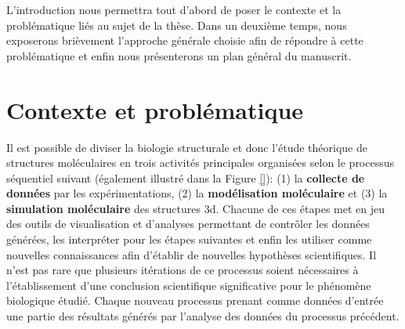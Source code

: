 


L'introduction nous permettra tout d'abord de poser le contexte et la problématique liés au sujet de la thèse. Dans un deuxième temps, nous exposerons brièvement l'approche générale choisie afin de répondre à cette problématique et enfin nous présenterons un plan général du manuscrit.

\section*{Contexte et problématique}

Il est possible de diviser la biologie structurale et donc l'étude théorique de structures moléculaires en trois activités principales organisées selon le processus séquentiel suivant (également illustré dans la Figure \ref{}): (1) la \textbf{collecte de données} par les expérimentations, (2) la \textbf{modélisation moléculaire} et (3) la \textbf{simulation moléculaire} des structures 3d. Chacune de ces étapes met en jeu des outils de visualisation et d'analyses permettant de contrôler les données générées, les interpréter pour les étapes suivantes et enfin les utiliser comme nouvelles connaissances afin d'établir de nouvelles hypothèses scientifiques. Il n'est pas rare que plusieurs itérations de ce processus soient nécessaires à l'établissement d'une conclusion scientifique significative pour le phénomène biologique étudié. Chaque nouveau processus prenant comme données d'entrée une partie des résultats générés par l'analyse des données du processus précédent.

